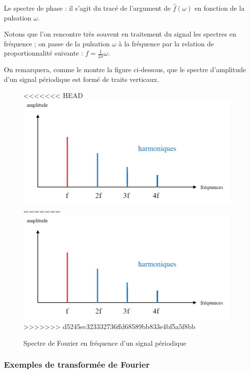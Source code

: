 Le spectre de phase :  il s'agit du tracé de l'argument de $\hat{f}(\omega)$ en fonction de la pulsation $\omega$.

Notons que l'on rencontre très souvent en traitement du signal les spectres en fréquence ; on passe de la pulsation $\omega$ à la fréquence par la relation de proportionnalité suivante : $f=\displaystyle \frac{1}{2\pi}\omega $.

On remarquera, comme le montre la figure ci-dessous, que le spectre d'amplitude d'un signal périodique est formé de traits verticaux.
\begin{figure}[!h]
\centering
<<<<<<< HEAD
\includegraphics[scale=0.4]{spectre.jpg}
=======
\includegraphics[scale=0.4]{images/spectre.jpg}
>>>>>>> d5245ec323332736ffd68589bb833e4bf5a5f8bb
\caption{Spectre de Fourier en fréquence d'un signal périodique}
\end{figure}

\subsubsection{Exemples de transformée de Fourier}

